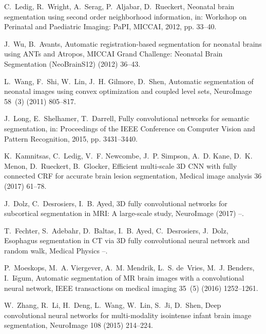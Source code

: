 \documentclass[twoside,espcrc2]{elsarticle}
\begin{document}
\begin{thebibliography}{10}
C.~Ledig, R.~Wright, A.~Serag, P.~Aljabar, D.~Rueckert, Neonatal brain
  segmentation using second order neighborhood information, in: Workshop on
  Perinatal and Paediatric Imaging: PaPI, MICCAI, 2012, pp. 33--40.

J.~Wu, B.~Avants, Automatic registration-based segmentation for neonatal brains
  using {ANT}s and {A}tropos, MICCAI Grand Challenge: Neonatal Brain
  Segmentation (NeoBrainS12) (2012) 36--43.

L.~Wang, F.~Shi, W.~Lin, J.~H. Gilmore, D.~Shen, Automatic segmentation of
  neonatal images using convex optimization and coupled level sets, NeuroImage
  58~(3) (2011) 805--817.

J.~Long, E.~Shelhamer, T.~Darrell, Fully convolutional networks for semantic
  segmentation, in: Proceedings of the IEEE Conference on Computer Vision and
  Pattern Recognition, 2015, pp. 3431--3440.

K.~Kamnitsas, C.~Ledig, V.~F. Newcombe, J.~P. Simpson, A.~D. Kane, D.~K. Menon,
  D.~Rueckert, B.~Glocker, Efficient multi-scale {3D} {CNN} with fully
  connected {CRF} for accurate brain lesion segmentation, Medical image
  analysis 36 (2017) 61--78.

J.~Dolz, C.~Desrosiers, I.~B. Ayed, {3D} fully convolutional networks for
  subcortical segmentation in {MRI}: A large-scale study, NeuroImage (2017) --.

T.~Fechter, S.~Adebahr, D.~Baltas, I.~B. Ayed, C.~Desrosiers, J.~Dolz,
  Esophagus segmentation in {CT} via
  {3D} fully convolutional neural network and random walk, Medical Physics --.

P.~Moeskops, M.~A. Viergever, A.~M. Mendrik, L.~S. de~Vries, M.~J. Benders,
  I.~I{\v{s}}gum, Automatic segmentation of {MR} brain images with a
  convolutional neural network, IEEE transactions on medical imaging 35~(5)
  (2016) 1252--1261.

W.~Zhang, R.~Li, H.~Deng, L.~Wang, W.~Lin, S.~Ji, D.~Shen, Deep convolutional
  neural networks for multi-modality isointense infant brain image
  segmentation, NeuroImage 108 (2015) 214--224.


\end{thebibliography}
\end{document}

